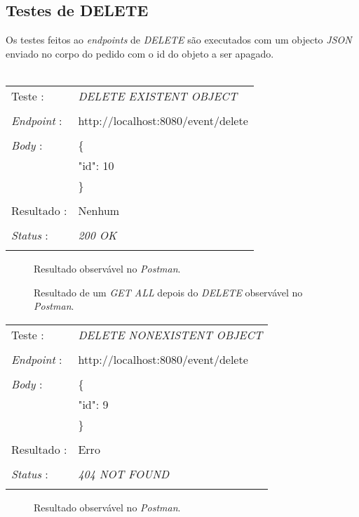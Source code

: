 \subsection{Testes de DELETE}\label{514}
Os testes feitos ao \emph{endpoints} de \emph{DELETE} são executados com um objecto \emph{JSON} enviado no corpo do pedido com o id do objeto a ser apagado.\\
\\
\begin{tabular}{ll}
	Teste : & \emph{DELETE EXISTENT OBJECT}\\
	\\
	\emph{Endpoint} : & http://localhost:8080/event/delete\\
	\\
	\emph{Body} : & \{ \\
	& "id": 10 \\
	& \} \\
	\\
	Resultado : & Nenhum\\
	\\
	\emph{Status} : & \emph{200 OK}\\
	\\
\end{tabular}

\begin{figure}[h]
	\begin{center}
	\end{center}
	\caption{Resultado observável no \emph{Postman}.}\label{fig:eventdelete}
\end{figure}
\newpage
\begin{figure}[h]
	\begin{center}
	\end{center}
	\caption{Resultado de um \emph{GET ALL} depois do \emph{DELETE} observável no \emph{Postman}.}\label{fig:eventallafterdelete}
\end{figure}
\newpage
\begin{tabular}{ll}
	Teste : & \emph{DELETE NONEXISTENT OBJECT}\\
	\\
	\emph{Endpoint} : & http://localhost:8080/event/delete\\
	\\
	\emph{Body} : & \{ \\
	& "id": 9 \\
	& \} \\
	\\
	Resultado : & Erro\\
	\\
	\emph{Status} : & \emph{404 NOT FOUND}\\
	\\
\end{tabular}

\begin{figure}[h]
	\begin{center}
	\end{center}
	\caption{Resultado observável no \emph{Postman}.}\label{fig:eventdelete404}
\end{figure}